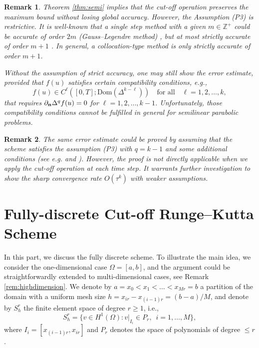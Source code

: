 \documentclass[a4paper, oneside]{book}
\newtheorem{remark}{Remark}[section]
\begin{document}
\begin{remark}\label{remark:p3}
Theorem \ref{thm:semi} implies that the cut-off operation preserves the maximum bound
without losing global accuracy. However, the Assumption (P3) is restrictive. It is well-known that a single step method
with a given $m \in \mathbb{Z}^+$ could be accurate of order $2m$ (Gauss--Legendre method) \cite[Section 2.2]{Ehle:thesis},
but at most strictly accurate of order $m+1$ \cite[Lemma 5]{BrennerCrouzeixThomee:1982}.
In general, a collocation-type method is only strictly accurate of order $m+1$.

Without the assumption of strict accuracy,  one may still show the error estimate,
provided that $f(u)$ satisfies certain compatibility conditions, e.g.,
$$ f(u) \in C^{\ell}([0,T]; \text{Dom}(\Delta^{k-\ell}))\quad \text{for all} \quad \ell=1,2,\ldots,k,$$
that requires
 $\partial_{\bf n} \Delta^q f(u) = 0$ for $\ell=1,2,\ldots,k-1$.
Unfortunately, those compatibility conditions cannot be fulfilled in general for semilinear parabolic problems.
\end{remark}

\begin{remark}\label{remark:p3-2}
The same error estimate could be proved by
assuming that the scheme satisfies the assumption (P3)
with $q=k-1$ and some additional conditions
(see e.g. \cite[Theorem 8.4]{Thomee:2006} and \cite{OstermannRoche:1992}).
However, the proof is not directly applicable when we apply the cut-off operation at each time step.
It warrants further investigation to show the sharp convergence rate $O(\tau^k)$ with weaker assumptions.
\end{remark}



\section{Fully-discrete Cut-off Runge--Kutta Scheme}\label{ssec:fully}
In this part, we discuss the fully discrete scheme. To illustrate the
main idea, we consider the one-dimensional case $\Omega=[a,b]$,
and the argument could be straightforwardly extended to multi-dimensional cases, see Remark \ref{rem:highdimension}.
We denote by $a=x_0<x_{1}<\dots<x_{Mr}=b$ a partition of the domain with a uniform mesh size $h=x_{ir} - x_{(i-1)r} = (b-a)/M$,
and denote by $S_h^r$ the finite element space of degree $r\ge 1$, i.e.,
$$
S_h^r=\{v\in H^1(\Omega): v|_{I_i}\in P_r,\,\,\, i=1,\dots,M\} ,
$$
where $I_i=[x_{(i-1)r},x_{ir}]$ and $P_r$ denotes the space of polynomials of degree $\le r$.
\end{document}
